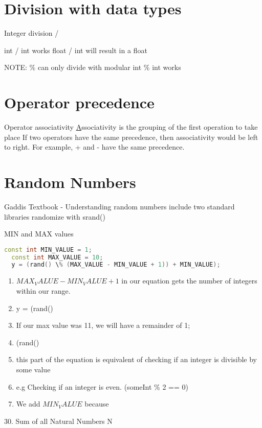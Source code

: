 \documentclass[a4paper,12pt]{book}
\begin{document}
\section{Division with data types}
Integer division /

int / int works
float / int will result in a float

NOTE: \% can only divide with modular
int \% int works

\section{Operator precedence}
Operator associativity
\hyperlink{https://www.geeksforgeeks.org/operator-precedence-and-associativity-in-c/}
Associativity is the grouping of the first operation to take place
If two operators have the same precedence, then associativity would be left to right. For example, + and - have the same precedence.



\section{Random Numbers}
Gaddis Textbook - Understanding random numbers
include two standard libraries
randomize with srand()

MIN and MAX values
\begin{lstlisting}[language=C++]
  const int MIN_VALUE = 1;
  const int MAX_VALUE = 10; 
  y = (rand() \% (MAX_VALUE - MIN_VALUE + 1)) + MIN_VALUE);
\end{lstlisting}

\begin{enumerate}
  \item $MAX_VALUE - MIN_VALUE + 1$ in our equation gets the number of integers within our range.
  \item y = (rand() %
  \item If our max value was 11, we will have a remainder of 1; 
  \item (rand() %
  \item this part of the equation is equivalent of checking if an integer is divisible by some value 
  \item e.g Checking if an integer is even. (someInt \% 2 == 0)
  \item We add $MIN_VALUE$ because 
\end{enumerate}


30. Sum of all Natural Numbers N \\ 
\end{document}
